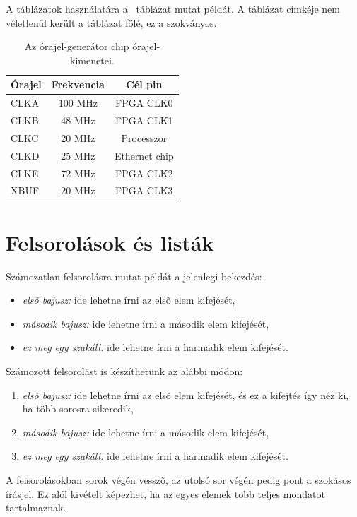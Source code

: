 A táblázatok használatára a ~táblázat mutat példát.
A táblázat címkéje nem véletlenül került a táblázat fölé, ez a szokványos.
\begin{table}[ht]
	\footnotesize
	\centering
	\caption{Az órajel-generátor chip órajel-kimenetei.} \label{tab:SysClocks}
	\begin{tabular}{ | l | c | c |}
	\hline
	Órajel & Frekvencia & Cél pin \\ \hline
	CLKA & 100 MHz & FPGA CLK0\\
	CLKB & 48 MHz  & FPGA CLK1\\
	CLKC & 20 MHz  & Processzor\\
	CLKD & 25 MHz  & Ethernet chip \\
	CLKE & 72 MHz  & FPGA CLK2\\
	XBUF & 20 MHz  & FPGA CLK3\\
	\hline
	\end{tabular}
	\label{tab:TabularExample}
\end{table}


\section{Felsorolások és listák}
Számozatlan felsorolásra mutat példát a jelenlegi bekezdés:
\begin{itemize}
	\item \emph{elsõ bajusz:} ide lehetne írni az elsõ elem kifejését,
	\item \emph{második bajusz:} ide lehetne írni a második elem kifejését,
	\item \emph{ez meg egy szakáll:} ide lehetne írni a harmadik elem kifejését.
\end{itemize}

Számozott felsorolást is készíthetünk az alábbi módon:
\begin{enumerate}
	\item \emph{elsõ bajusz:} ide lehetne írni az elsõ elem kifejését, és ez a kifejtés így néz ki, ha több sorosra sikeredik,
	\item \emph{második bajusz:} ide lehetne írni a második elem kifejését,
	\item \emph{ez meg egy szakáll:} ide lehetne írni a harmadik elem kifejését.
\end{enumerate}
A felsorolásokban sorok végén vesszõ, az utolsó sor végén pedig pont a szokásos írásjel. Ez alól kivételt képezhet, ha az egyes elemek több teljes mondatot tartalmaznak.

